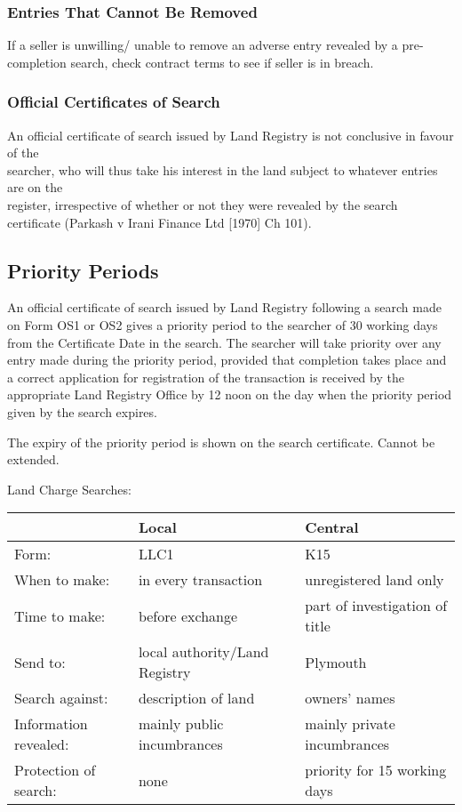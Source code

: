 \documentclass[
]{article}
\begin{document}
\hypertarget{entries-that-cannot-be-removed}{%
\subsubsection{Entries That Cannot Be
Removed}\label{entries-that-cannot-be-removed}}

If a seller is unwilling/ unable to remove an adverse entry revealed by
a pre-completion search, check contract terms to see if seller is in
breach.

\hypertarget{official-certificates-of-search}{%
\subsubsection{Official Certificates of
Search}\label{official-certificates-of-search}}

An official certificate of search issued by Land Registry is not
conclusive in favour of the\\
searcher, who will thus take his interest in the land subject to
whatever entries are on the\\
register, irrespective of whether or not they were revealed by the
search certificate (Parkash v Irani Finance Ltd {[}1970{]} Ch 101).

\hypertarget{priority-periods}{%
\subsection{Priority Periods}\label{priority-periods}}

An official certificate of search issued by Land Registry following a
search made on Form OS1 or OS2 gives a priority period to the searcher
of 30 working days from the Certificate Date in the search. The searcher
will take priority over any entry made during the priority period,
provided that completion takes place and a correct application for
registration of the transaction is received by the appropriate Land
Registry Office by 12 noon on the day when the priority period given by
the search expires.

The expiry of the priority period is shown on the search certificate.
Cannot be extended.

Land Charge Searches:

\begin{longtable}[]{@{}lll@{}}
\toprule()
& Local & Central \\
\midrule()
\endhead
Form: & LLC1 & K15 \\
When to make: & in every transaction & unregistered land only \\
Time to make: & before exchange & part of investigation of title \\
Send to: & local authority/Land Registry & Plymouth \\
Search against: & description of land & owners' names \\
Information revealed: & mainly public incumbrances & mainly private
incumbrances \\
Protection of search: & none & priority for 15 working days \\
\bottomrule()
\end{longtable}
\end{document}
